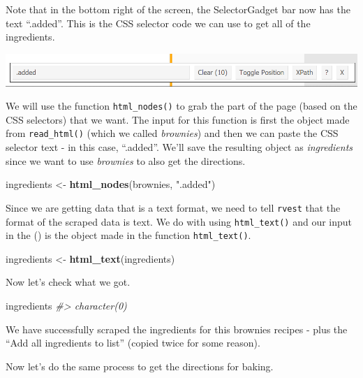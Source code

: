 \documentclass[
  12pt,
]{book}
\newenvironment{Shaded}{\begin{snugshade}}{\end{snugshade}}
\newcommand{\CommentTok}[1]{\textcolor[rgb]{0.37,0.37,0.37}{\textit{#1}}}
\newcommand{\KeywordTok}[1]{\textcolor[rgb]{0.27,0.27,0.27}{\textbf{#1}}}
\newcommand{\NormalTok}[1]{#1}
\newcommand{\StringTok}[1]{\textcolor[rgb]{0.5,0.5,0.5}{#1}}
\begin{document}
Note that in the bottom right of the screen, the SelectorGadget bar now has the text ``.added''. This is the CSS selector code we can use to get all of the ingredients.

\includegraphics{images/brownies_4.PNG}

We will use the function \texttt{html\_nodes()} to grab the part of the page (based on the CSS selectors) that we want. The input for this function is first the object made from \texttt{read\_html()} (which we called \emph{brownies}) and then we can paste the CSS selector text - in this case, ``.added''. We'll save the resulting object as \emph{ingredients} since we want to use \emph{brownies} to also get the directions.

\begin{Shaded}
\begin{Highlighting}[]
\NormalTok{ingredients <{-}}\StringTok{ }\KeywordTok{html\_nodes}\NormalTok{(brownies, }\StringTok{".added"}\NormalTok{)}
\end{Highlighting}
\end{Shaded}

Since we are getting data that is a text format, we need to tell \texttt{rvest} that the format of the scraped data is text. We do with using \texttt{html\_text()} and our input in the () is the object made in the function \texttt{html\_text()}.

\begin{Shaded}
\begin{Highlighting}[]
\NormalTok{ingredients <{-}}\StringTok{ }\KeywordTok{html\_text}\NormalTok{(ingredients)}
\end{Highlighting}
\end{Shaded}

Now let's check what we got.

\begin{Shaded}
\begin{Highlighting}[]
\NormalTok{ingredients}
\CommentTok{\#> character(0)}
\end{Highlighting}
\end{Shaded}

We have successfully scraped the ingredients for this brownies recipes - plus the ``Add all ingredients to list'' (copied twice for some reason).

Now let's do the same process to get the directions for baking.
\end{document}
